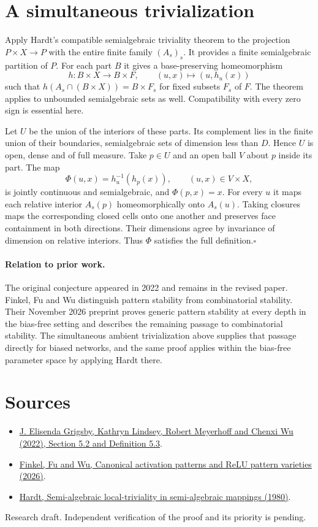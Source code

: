 \documentclass[11pt]{article}
\begin{document}
\section*{A simultaneous trivialization}
Apply Hardt's compatible semialgebraic triviality theorem to the projection $P\times X\to P$ with the entire finite family $(A_s)_s$. It provides a finite semialgebraic partition of $P$. For each part $B$ it gives a base-preserving homeomorphism
\[
 h:B\times X\longrightarrow B\times F,\qquad (u,x)\longmapsto (u,h_u(x))
\]
such that $h(A_s\cap(B\times X))=B\times F_s$ for fixed subsets $F_s$ of $F$. The theorem applies to unbounded semialgebraic sets as well. Compatibility with every zero sign is essential here.

Let $U$ be the union of the interiors of these parts. Its complement lies in the finite union of their boundaries, semialgebraic sets of dimension less than $D$. Hence $U$ is open, dense and of full measure. Take $p\in U$ and an open ball $V$ about $p$ inside its part. The map
\[
 \Phi(u,x)=h_u^{-1}(h_p(x)),\qquad (u,x)\in V\times X,
\]
is jointly continuous and semialgebraic, and $\Phi(p,x)=x$. For every $u$ it maps each relative interior $A_s(p)$ homeomorphically onto $A_s(u)$. Taking closures maps the corresponding closed cells onto one another and preserves face containment in both directions. Their dimensions agree by invariance of dimension on relative interiors. Thus $\Phi$ satisfies the full definition.\hfill$\square$

\paragraph{Relation to prior work.} The original conjecture appeared in 2022 and remains in the revised paper. Finkel, Fu and Wu distinguish pattern stability from combinatorial stability. Their November 2026 preprint proves generic pattern stability at every depth in the bias-free setting and describes the remaining passage to combinatorial stability. The simultaneous ambient trivialization above supplies that passage directly for biased networks, and the same proof applies within the bias-free parameter space by applying Hardt there.

\section*{Sources}
\begin{itemize}
\item \href{https://arxiv.org/abs/2209.04036}{J. Elisenda Grigsby, Kathryn Lindsey, Robert Meyerhoff and Chenxi Wu (2022), Section 5.2 and Definition 5.3}.
\item \href{https://arxiv.org/abs/2611.20346}{Finkel, Fu and Wu, Canonical activation patterns and ReLU pattern varieties (2026)}.
\item \href{https://doi.org/10.2307/2374240}{Hardt, Semi-algebraic local-triviality in semi-algebraic mappings (1980)}.
\end{itemize}
{\small Research draft. Independent verification of the proof and its priority is pending.}
\end{document}
